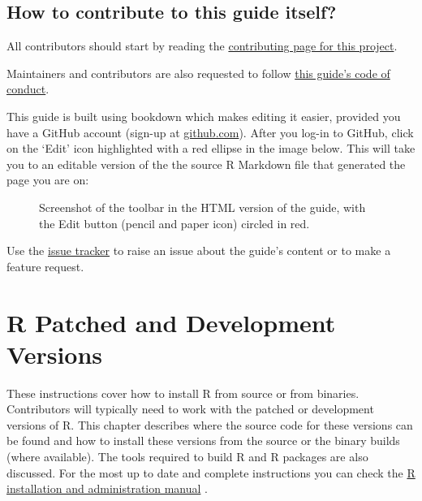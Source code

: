 \documentclass[
  letterpaper,
  DIV=11,
  numbers=noendperiod]{scrreprt}
\makeatletter
\newcommand*\pandocbounded[1]{%
  \sbox\pandoc@box{#1}%
  \Gscale@div\@tempa{\textheight}{\dimexpr\ht\pandoc@box+\dp\pandoc@box\relax}%
  \Gscale@div\@tempb{\linewidth}{\wd\pandoc@box}%
  \ifdim\@tempb\p@<\@tempa\p@\let\@tempa\@tempb\fi%
  \ifdim\@tempa\p@<\p@\scalebox{\@tempa}{\usebox\pandoc@box}%
  \else\usebox{\pandoc@box}%
  \fi%
}
\makeatother
\begin{document}
\section{How to contribute to this guide
itself?}\label{how-to-contribute-to-this-guide}

All contributors should start by reading the
\href{https://github.com/r-devel/rdevguide/blob/main/CONTRIBUTING.md}{contributing
page for this project}.

Maintainers and contributors are also requested to follow
\href{https://github.com/r-devel/rdevguide/blob/main/CONDUCT.md}{this
guide's code of conduct}.

This guide is built using bookdown which makes editing it easier,
provided you have a GitHub account (sign-up at
\href{https://github.com/}{github.com}). After you log-in to GitHub,
click on the `Edit' icon highlighted with a red ellipse in the image
below. This will take you to an editable version of the the source R
Markdown file that generated the page you are on:

\begin{figure}[H]

{\centering \pandocbounded{\texttt{[image: chapters/img/edit\_icon.png]}}

}

\caption{Screenshot of the toolbar in the HTML version of the guide,
with the Edit button (pencil and paper icon) circled in red.}

\end{figure}%

Use the \href{https://github.com/r-devel/rdevguide/issues}{issue
tracker} to raise an issue about the guide's content or to make a
feature request.


\chapter{R Patched and Development Versions}\label{GetStart}

These instructions cover how to install R from source or from binaries.
Contributors will typically need to work with the patched or development
versions of R. This chapter describes where the source code for these
versions can be found and how to install these versions from the source
or the binary builds (where available). The tools required to build R
and R packages are also discussed. For the most up to date and complete
instructions you can check the
\href{https://cran.r-project.org/doc/manuals/r-devel/R-admin.html}{R
installation and administration manual} .
\end{document}
